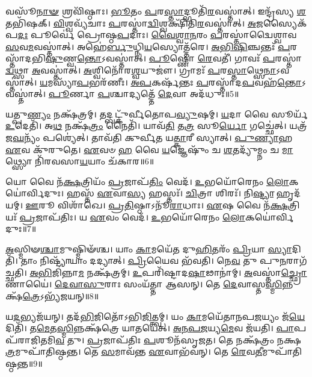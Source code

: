 𑌵𑌸𑍂᳴\-\ul{𑌨𑌾}\-\-\ul{𑍟} 𑌶𑍍𑌰𑌵𑌿᳴𑌷𑍍𑌠𑌾𑌃।
\-\ul{𑌭𑍂}\-𑌤𑌂 \ul{𑌪}\-𑌰\-\ul{𑌸𑍍𑌤𑌾}\-𑌦𑍍𑌭𑍂𑌤𑌿᳴\-\ul{𑌰}\-𑌵𑌸𑍍𑌤𑌾॑𑌤𑍍।
𑌇𑌨𑍍𑌦𑍍𑌰᳴𑌸𑍍𑌯 \ul{𑌶}\-𑌤𑌭𑌿᳴𑌷𑌕𑍍।
\-\ul{𑌵𑌿}\-𑌶𑍍𑌵𑌵𑍍𑌯᳴𑌚𑌾𑌃 \ul{𑌪}\-𑌰𑌸𑍍𑌤𑌾॑\-\ul{𑌦𑍍𑌵𑌿}\-𑌶𑍍𑌵𑌕𑍍𑌷𑌿᳴𑌤𑌿\-\ul{𑌰}\-𑌵𑌸𑍍𑌤𑌾॑𑌤𑍍।
\-\ul{𑌅}\-𑌜𑌸𑍍𑌯𑍈𑌕᳴𑌪\-\ul{𑌦𑌃} 𑌪𑍂𑌰𑍍𑌵𑍇॑ 𑌪𑍍𑌰𑍋𑌷𑍍𑌠\-\ul{𑌪}\-𑌦𑌾𑌃।
\-\ul{𑌵𑍈}\-\-\ul{𑌶𑍍𑌵𑌾}\-\-\ul{𑌨}\-𑌰𑌂 \ul{𑌪}\-𑌰𑌸𑍍𑌤𑌾॑𑌦𑍍𑌵𑍈𑌶𑍍𑌵𑌾𑌵\-\ul{𑌸}\-𑌵\-\ul{𑌮}\-\-𑌵𑌸𑍍𑌤𑌾॑𑌤𑍍।
𑌅𑌹𑍇॑\-\ul{𑌰𑍍𑌬𑍁}\-𑌧𑍍𑌨𑌿\-\ul{𑌯}\-𑌸𑍍𑌯𑍋\-𑌤𑍍𑌤᳴𑌰𑍇।
\-\ul{𑌅}\-\-\ul{𑌭𑌿}\-\-\ul{𑌷𑌿}\-𑌞𑍍𑌚𑌨𑍍𑌤𑌃᳴ \ul{𑌪}\-𑌰𑌸𑍍𑌤𑌾᳴𑌦𑌭𑌿\-\-\ul{𑌷𑍁}\-𑌣𑍍𑌵\-\ul{𑌨𑍍𑌤𑍋}\-\-𑌽𑌵𑌸𑍍𑌤𑌾॑𑌤𑍍।
\-\ul{𑌪𑍂}\-𑌷𑍍𑌣𑍋 \ul{𑌰𑍇}\-𑌵𑌤𑍀॑।
𑌗𑌾𑌵𑌃᳴ \ul{𑌪}\-𑌰𑌸𑍍𑌤𑌾॑\-\ul{𑌦𑍍𑌵}\-𑌥𑍍𑌸𑌾 \ul{𑌅}\-𑌵𑌸𑍍𑌤𑌾॑𑌤𑍍।
\-\ul{𑌅}\-𑌶𑍍𑌵𑌿𑌨𑍋᳴𑌰\-\ul{𑌶𑍍𑌵}\-𑌯𑍁𑌜𑍗॑।
𑌗𑍍𑌰𑌾𑌮𑌃᳴ \ul{𑌪}\-𑌰\-\ul{𑌸𑍍𑌤𑌾}\-𑌥𑍍𑌸𑍇\-\ul{𑌨𑌾}\-\-𑌽𑌵𑌸𑍍𑌤𑌾॑𑌤𑍍।
\-\ul{𑌯}\-𑌮𑌸𑍍𑌯𑌾᳴\-\ul{𑌪}\-𑌭𑌰᳴𑌣𑍀𑌃।
\-\ul{𑌅}\-\-\ul{𑌪}\-𑌕𑌰𑍍\mbox{}𑌷᳴𑌨𑍍𑌤𑌃 \ul{𑌪}\-𑌰𑌸𑍍𑌤𑌾᳴𑌦\-\ul{𑌪}\-𑌵𑌹᳴\-\ul{𑌨𑍍𑌤𑍋}\-\-𑌽𑌵𑌸𑍍𑌤𑌾॑𑌤𑍍।
\-\ul{𑌪𑍂}\-𑌰𑍍𑌣𑌾 \ul{𑌪}\-𑌶𑍍𑌚𑌾𑌦𑍍𑌯𑌤𑍍𑌤𑍇᳴ \ul{𑌦𑍇}\-𑌵𑌾 𑌅𑌦᳴𑌧𑍁𑌃॥5॥\anuvakamend[\-\ul{𑌆}\-𑌰𑍍𑌦𑍍𑌰\-\ul{𑌮}\-𑌵\-\ul{𑌸𑍍𑌤𑌾}\-𑌦𑍍𑌵𑌹᳴𑌮𑌾𑌨𑌾 \ul{𑌅}\-𑌵𑌸𑍍𑌤𑌾᳴\-\ul{𑌦}\-𑌭𑍍𑌯𑌾𑌰𑍂᳴𑌢\-\ul{𑌮}\-𑌵\-\ul{𑌸𑍍𑌤𑌾}\-𑌤𑍍𑌪𑌨𑍍𑌥𑌾᳴ \ul{𑌅}\-𑌵𑌸𑍍𑌤𑌾॑\-\ul{𑌦𑍍𑌵}\-𑌥𑍍𑌸𑌾 \ul{𑌅}\-𑌵\-\ul{𑌸𑍍𑌤𑌾}\-𑌤𑍍𑌪𑌞𑍍𑌚᳴ 𑌚]

𑌯𑌤𑍍𑌪𑍁\-\ul{𑌣𑍍𑌯𑌂} 𑌨𑌕𑍍𑌷᳴𑌤𑍍𑌰𑌮𑍍।
𑌤𑌦𑍍𑌬𑌟𑍍𑌕𑍁᳴𑌰𑍍𑌵𑍀𑌤𑍋𑌪\-\ul{𑌵𑍍𑌯𑍁}\-𑌷𑌮𑍍।
\-\ul{𑌯}\-𑌦𑌾 𑌵𑍈 𑌸𑍂𑌰𑍍𑌯᳴ \ul{𑌉}\-𑌦𑍇𑌤𑌿᳴।
𑌅\-\ul{𑌥} 𑌨𑌕𑍍𑌷᳴\-\ul{𑌤𑍍𑌰𑌂} 𑌨𑍈𑌤𑌿᳴।
𑌯𑌾𑌵᳴\-\ul{𑌤𑌿} 𑌤\-\ul{𑌤𑍍𑌰} 𑌸𑍂\-\ul{𑌰𑍍𑌯𑍋} 𑌗𑌚𑍍𑌛𑍇॑𑌤𑍍।
𑌯𑌤𑍍𑌰᳴ 𑌜\-\ul{𑌘}\-𑌨𑍍𑌯𑌂᳴ 𑌪𑌶𑍍𑌯𑍇॑𑌤𑍍।
𑌤𑌾𑌵᳴𑌤𑌿 𑌕𑍁𑌰𑍍𑌵𑍀𑌤 𑌯\-\ul{𑌤𑍍𑌕𑌾}\-𑌰𑍀 𑌸𑍍𑌯𑌾𑌤𑍍।
\-\ul{𑌪𑍁}\-\-\ul{𑌣𑍍𑌯𑌾}\-𑌹 \ul{𑌏}\-𑌵 𑌕𑍁᳴𑌰𑍁𑌤𑍇।
\-\ul{𑌏}\-𑌵𑍞 \ul{𑌹} 𑌵𑍈 \ul{𑌯}\-𑌜𑍍𑌞𑍇𑌷𑍁𑌂᳴ 𑌚 \ul{𑌶}\-𑌤𑌦𑍍𑌯𑍁᳴𑌮𑍍𑌨𑌂 𑌚 \ul{𑌮𑌾}\-𑌥𑍍𑌸𑍍𑌯𑍋 𑌨𑌿᳴𑌰𑌵𑌸𑌾\-\ul{𑌯}\-𑌯𑌾𑌂 𑌚᳴𑌕𑌾𑌰॥6॥

𑌯𑍋 𑌵𑍈 𑌨᳴\-\ul{𑌕𑍍𑌷}\-𑌤𑍍𑌰𑌿𑌯𑌂᳴ \ul{𑌪𑍍𑌰}\-𑌜𑌾𑌪᳴\-\ul{𑌤𑌿𑌂} 𑌵𑍇𑌦᳴।
\-\ul{𑌉}\-𑌭𑌯𑍋᳴𑌰𑍇𑌨𑌂 \ul{𑌲𑍋}\-𑌕𑌯𑍋॑𑌰𑍍𑌵𑌿𑌦𑍁𑌃।
𑌹𑌸𑍍𑌤᳴ \ul{𑌏}\-𑌵𑌾\-\ul{𑌸𑍍𑌯} 𑌹𑌸𑍍𑌤𑌃᳴।
\-\ul{𑌚𑌿}\-𑌤𑍍𑌰𑌾 𑌶𑌿𑌰𑌃᳴।
𑌨𑌿\-\ul{𑌷𑍍𑌟𑍍𑌯𑌾} 𑌹𑍃𑌦᳴𑌯𑌮𑍍।
\-\ul{𑌊}\-𑌰𑍂 𑌵𑌿𑌶𑌾᳴𑌖𑍇।
\-\ul{𑌪𑍍𑌰}\-\-\ul{𑌤𑌿}\-𑌷𑍍𑌠𑌾\-𑌽𑌨𑍂᳴\-\ul{𑌰𑌾}\-𑌧𑌾𑌃।
\-\ul{𑌏}\-𑌷 𑌵𑍈 𑌨᳴\-\ul{𑌕𑍍𑌷}\-𑌤𑍍𑌰𑌿𑌯𑌃᳴ \ul{𑌪𑍍𑌰}\-𑌜𑌾\-𑌪᳴𑌤𑌿𑌃।
𑌯 \ul{𑌏}\-𑌵𑌂 𑌵𑍇𑌦᳴।
\-\ul{𑌉}\-𑌭𑌯𑍋᳴𑌰𑍇𑌨𑌂 \ul{𑌲𑍋}\-𑌕𑌯𑍋॑𑌰𑍍𑌵𑌿𑌦𑍁𑌃॥7॥

\-\ul{𑌅}\-𑌸𑍍𑌮𑌿𑍟\-\ul{𑌶𑍍𑌚𑌾}\-𑌮𑍁𑌷𑍍𑌮𑌿𑍟᳴𑌶𑍍𑌚।
𑌯𑌾𑌂 \ul{𑌕𑌾}\-𑌮𑌯𑍇᳴𑌤 𑌦𑍁\-\ul{𑌹𑌿}\-𑌤𑌰𑌂᳴ \ul{𑌪𑍍𑌰𑌿}\-𑌯𑌾 \ul{𑌸𑍍𑌯𑌾}\-𑌦𑌿𑌤𑌿᳴।
𑌤𑌾𑌂 𑌨𑌿𑌷𑍍𑌟𑍍𑌯𑌾᳴𑌯𑌾𑌂 𑌦𑌦𑍍𑌯𑌾𑌤𑍍।
\-\ul{𑌪𑍍𑌰𑌿}\-𑌯𑍈𑌵 𑌭᳴𑌵𑌤𑌿।
𑌨𑍇\-\ul{𑌵} 𑌤𑍁 𑌪𑍁\-\ul{𑌨}\-𑌰𑌾𑌗᳴𑌚𑍍𑌛𑌤𑌿।
\-\ul{𑌅}\-\-\ul{𑌭𑌿}\-𑌜𑌿𑌨𑍍𑌨𑌾\-\ul{𑌮} 𑌨𑌕𑍍𑌷᳴𑌤𑍍𑌰𑌮𑍍।
\-\ul{𑌉}\-𑌪𑌰𑌿᳴𑌷𑍍𑌟𑌾𑌦\-\ul{𑌷𑌾}\-𑌢𑌾𑌨𑌾॑𑌮𑍍।
\-\ul{𑌅}\-𑌵𑌸𑍍𑌤𑌾॑\-\ul{𑌚𑍍𑌛𑍍𑌰𑍋}\-𑌣𑌾𑌯𑍈॑।
\-\ul{𑌦𑍇}\-\-\ul{𑌵𑌾}\-\-\ul{𑌸𑍁}\-𑌰𑌾𑌃 𑌸𑌂𑌯᳴𑌤𑍍𑌤𑌾 𑌆𑌸𑌨𑍍।
𑌤𑍇 \ul{𑌦𑍇}\-𑌵𑌾𑌸𑍍𑌤\-\ul{𑌸𑍍𑌮𑌿}\-𑌨𑍍𑌨𑌕𑍍𑌷᳴\-\ul{𑌤𑍍𑌰𑍇}\-\-𑌽𑌭𑍍𑌯᳴𑌜𑌯𑌨𑍍॥8॥

𑌯\-\ul{𑌦}\-𑌭𑍍𑌯𑌜᳴𑌯𑌨𑍍।
𑌤𑌦᳴\-\ul{𑌭𑌿}\-𑌜𑌿𑌤𑍋᳴\-𑌽𑌭𑌿\-\ul{𑌜𑌿}\-𑌤𑍍𑌤𑍍𑌵𑌮𑍍।
𑌯𑌂 \ul{𑌕𑌾}\-𑌮𑌯𑍇᳴𑌤𑌾𑌨𑌪\-\-\ul{𑌜}\-𑌯𑍍𑌯𑌂 𑌜᳴\-\ul{𑌯𑍇}\-𑌦𑌿𑌤𑌿᳴।
𑌤\-\ul{𑌮𑍇}\-𑌤\-\ul{𑌸𑍍𑌮𑌿}\-𑌨𑍍𑌨𑌕𑍍𑌷᳴𑌤𑍍𑌰𑍇 𑌯𑌾𑌤𑌯𑍇𑌤𑍍।
\-\ul{𑌅}\-\-\ul{𑌨}\-\-\ul{𑌪}\-\-\ul{𑌜}\-𑌯𑍍𑌯\-\ul{𑌮𑍇}\-𑌵 𑌜᳴𑌯𑌤𑌿।
\-\ul{𑌪𑌾}\-𑌪𑌪᳴𑌰𑌾𑌜𑌿𑌤𑌮𑌿\-\ul{𑌵} 𑌤𑍁।
\-\ul{𑌪𑍍𑌰}\-𑌜𑌾\-𑌪᳴𑌤𑌿𑌃 \ul{𑌪}\-𑌶𑍂𑌨᳴\-𑌸𑍃𑌜𑌤।
𑌤𑍇 𑌨𑌕𑍍𑌷᳴𑌤𑍍𑌰𑌂 𑌨𑌕𑍍𑌷\-\ul{𑌤𑍍𑌰}\-𑌮𑍁𑌪𑌾᳴𑌤𑌿𑌷𑍍𑌠𑌨𑍍𑌤।
𑌤𑍇 \ul{𑌸}\-𑌮𑌾𑌵᳴𑌨𑍍𑌤 \ul{𑌏}\-𑌵𑌾𑌭᳴𑌵𑌨𑍍।
𑌤𑍇 \ul{𑌰𑍇}\-𑌵\-\ul{𑌤𑍀}\-𑌮𑍁𑌪𑌾᳴𑌤𑌿𑌷𑍍𑌠𑌨𑍍𑌤॥9॥

